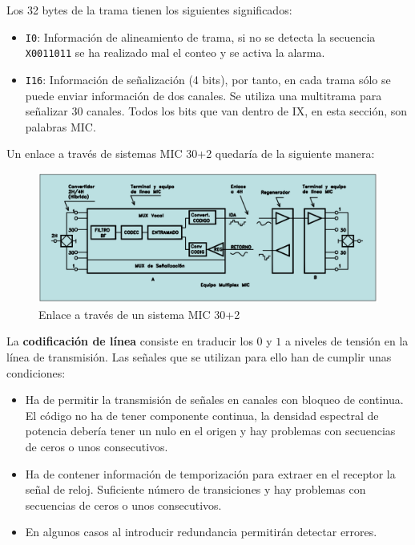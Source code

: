 \documentclass[10pt,portrait, twocolumn]{article}
\makeatletter
\renewcommand{\subsubsection}{\@startsection{subsubsection}{3}{0mm}%
                                {-1ex plus -.5ex minus -.2ex}%
                                {1ex plus .2ex}%
                                {\normalfont\small\bfseries}}
\makeatother
\begin{document}
Los 32 bytes de la trama tienen los siguientes significados:

	\begin{itemize}
		\item \texttt{I0}: Información de alineamiento de trama, si no se detecta la secuencia \texttt{X0011011} se ha realizado mal el conteo y se activa la alarma.
		\item \texttt{I16}: Información de señalización (4 bits), por tanto, en cada trama sólo se puede enviar información de dos canales. Se utiliza una multitrama para señalizar 30 canales. Todos los bits que van dentro de IX, en esta sección, son palabras MIC.
	\end{itemize}

Un enlace a través de sistemas MIC 30+2 quedaría de la siguiente manera:

	
	\begin{figure}[!ht]
 		\centering
  		 \includegraphics[scale = 0.4]{images/EnlaceMIC}
		\caption{Enlace a través de un sistema MIC 30+2}
	\end{figure}
	

La \textbf{codificación de línea} consiste en traducir los $0$ y $1$ a niveles de tensión en la línea de transmisión. Las señales que se utilizan para ello han de cumplir unas condiciones:

	\begin{itemize}
		\item Ha de permitir la transmisión de señales en canales con bloqueo de continua. El código no ha de tener componente continua, la densidad espectral de potencia debería tener un nulo en el origen y hay problemas con secuencias de ceros o unos consecutivos.
		\item Ha de contener información de temporización para extraer en el receptor la señal de reloj. Suficiente número de transiciones y hay problemas con secuencias de ceros o unos consecutivos.
		\item En algunos casos al introducir redundancia permitirán detectar errores.
	\end{itemize}
	
\end{document}
